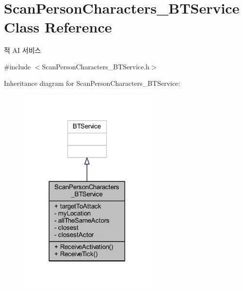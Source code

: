 \hypertarget{class_scan_person_characters___b_t_service}{}\section{Scan\+Person\+Characters\+\_\+\+B\+T\+Service Class Reference}
\label{class_scan_person_characters___b_t_service}


적 AI 서비스  




{\ttfamily \#include $<$Scan\+Person\+Characters\+\_\+\+B\+T\+Service.\+h$>$}



Inheritance diagram for Scan\+Person\+Characters\+\_\+\+B\+T\+Service\+:\nopagebreak
\begin{figure}[H]
\begin{center}
\leavevmode
\includegraphics[width=197pt]{class_scan_person_characters___b_t_service__inherit__graph}
\end{center}
\end{figure}


